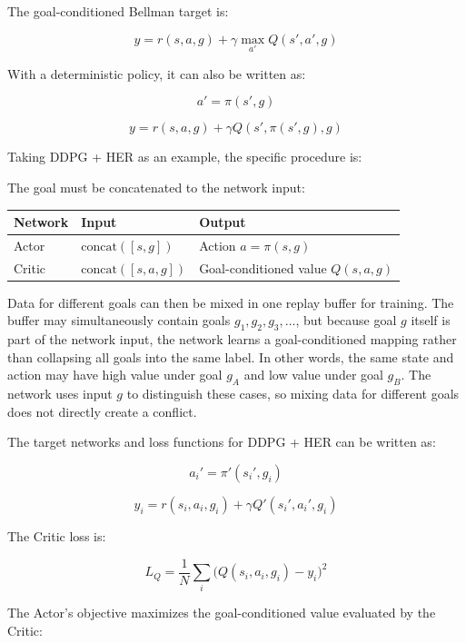 The goal-conditioned Bellman target is:

\[
y
=
r(s,a,g)
+
\gamma
\max_{a'}Q(s',a',g)
\]

With a deterministic policy, it can also be written as:

\[
a'=\pi(s',g)
\]

\[
y
=
r(s,a,g)
+
\gamma Q(s',\pi(s',g),g)
\]

Taking DDPG + HER as an example, the specific procedure is:

The goal must be concatenated to the network input:

\begin{longtable}[]{@{}
  >{\raggedright\arraybackslash}p{}
  >{\raggedright\arraybackslash}p{}
  >{\raggedright\arraybackslash}p{}@{}}
\toprule
Network & Input & Output \\
\midrule
\endhead
Actor & \(\mathrm{concat}([s,g])\) & Action \(a=\pi(s,g)\) \\
Critic & \(\mathrm{concat}([s,a,g])\) & Goal-conditioned value \(Q(s,a,g)\) \\
\bottomrule
\end{longtable}

Data for different goals can then be mixed in one replay buffer for training. The buffer may simultaneously contain goals \(g_1,g_2,g_3,\ldots\), but because goal \(g\) itself is part of the network input, the network learns a goal-conditioned mapping rather than collapsing all goals into the same label. In other words, the same state and action may have high value under goal \(g_A\) and low value under goal \(g_B\). The network uses input \(g\) to distinguish these cases, so mixing data for different goals does not directly create a conflict.

The target networks and loss functions for DDPG + HER can be written as:

\[
a_i'=\pi'(s_i',g_i)
\]

\[
y_i
=
r(s_i,a_i,g_i)
+
\gamma Q'(s_i',a_i',g_i)
\]

The Critic loss is:

\[
L_Q
=
\frac{1}{N}
\sum_i
\bigl(
Q(s_i,a_i,g_i)-y_i
\bigr)^{2}
\]

The Actor's objective maximizes the goal-conditioned value evaluated by the Critic:


